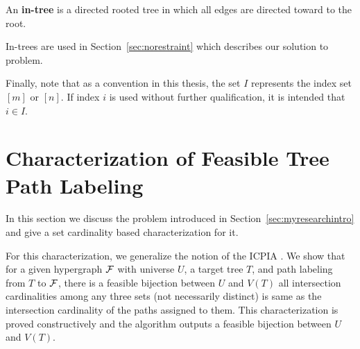 

\begin{definition}[In-tree]
An \textbf{in-tree} is a directed rooted tree in which all edges are
directed toward to the root.  
\end{definition}
In-trees are used in Section~\ref{sec:norestraint} which describes our
solution to \CFTPL problem.

Finally, note that as a convention in this thesis, the set $I$
represents the index set $[m]$ or $[n]$. If index $i$ is used without further
qualification, it is intended that $i \in I$.

\section[Characterization of FTPL]{Characterization of Feasible Tree
  Path Labeling}
\label{sec:feasible}

In this section we discuss the \FTPL problem introduced in
Section~\ref{sec:myresearchintro} and give a set cardinality based
characterization for it.


For this characterization, we generalize the notion of the ICPIA
\cite{nsnrs09}.  We show that for a given hypergraph ${\cal F}$ with
universe $U$, a target tree $T$, and path labeling from $T$ to ${\cal F}$, there
is a feasible bijection between $U$ and $V(T)$ \iff all intersection
cardinalities among any three sets (not necessarily distinct) is same
as the intersection cardinality of the paths assigned to them.  This
characterization is proved constructively and the algorithm outputs a
feasible bijection between $U$ and $V(T)$.

